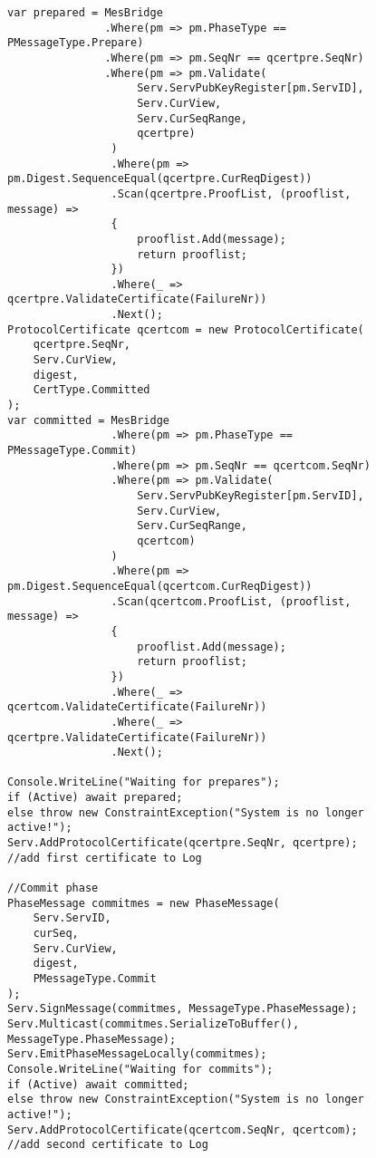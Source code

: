 \begin{figure}[H]
	\centering
	\begin{lstlisting}[label = code:PrepareAndCommit, caption= Prepare and Commit phase, captionpos = b, basicstyle=\scriptsize]
var prepared = MesBridge
               .Where(pm => pm.PhaseType == PMessageType.Prepare)
               .Where(pm => pm.SeqNr == qcertpre.SeqNr)
               .Where(pm => pm.Validate(
                    Serv.ServPubKeyRegister[pm.ServID], 
                    Serv.CurView, 
                    Serv.CurSeqRange, 
                    qcertpre)
                )
                .Where(pm => pm.Digest.SequenceEqual(qcertpre.CurReqDigest))
                .Scan(qcertpre.ProofList, (prooflist, message) =>
                {
                    prooflist.Add(message);
                    return prooflist;
                })
                .Where(_ => qcertpre.ValidateCertificate(FailureNr))
                .Next();
ProtocolCertificate qcertcom = new ProtocolCertificate(
    qcertpre.SeqNr, 
    Serv.CurView, 
    digest, 
    CertType.Committed
);   
var committed = MesBridge
                .Where(pm => pm.PhaseType == PMessageType.Commit)
                .Where(pm => pm.SeqNr == qcertcom.SeqNr)
                .Where(pm => pm.Validate(
                    Serv.ServPubKeyRegister[pm.ServID], 
                    Serv.CurView, 
                    Serv.CurSeqRange, 
                    qcertcom)
                )
                .Where(pm => pm.Digest.SequenceEqual(qcertcom.CurReqDigest))
                .Scan(qcertcom.ProofList, (prooflist, message) =>
                {
                    prooflist.Add(message);
                    return prooflist;
                })
                .Where(_ => qcertcom.ValidateCertificate(FailureNr))
                .Where(_ => qcertpre.ValidateCertificate(FailureNr))
                .Next();
                
Console.WriteLine("Waiting for prepares");
if (Active) await prepared;
else throw new ConstraintException("System is no longer active!");
Serv.AddProtocolCertificate(qcertpre.SeqNr, qcertpre); //add first certificate to Log

//Commit phase
PhaseMessage commitmes = new PhaseMessage(
    Serv.ServID, 
    curSeq, 
    Serv.CurView, 
   	digest, 
    PMessageType.Commit
);
Serv.SignMessage(commitmes, MessageType.PhaseMessage);
Serv.Multicast(commitmes.SerializeToBuffer(), MessageType.PhaseMessage);
Serv.EmitPhaseMessageLocally(commitmes);
Console.WriteLine("Waiting for commits");
if (Active) await committed;
else throw new ConstraintException("System is no longer active!");
Serv.AddProtocolCertificate(qcertcom.SeqNr, qcertcom); //add second certificate to Log
	\end{lstlisting}
\end{figure}

